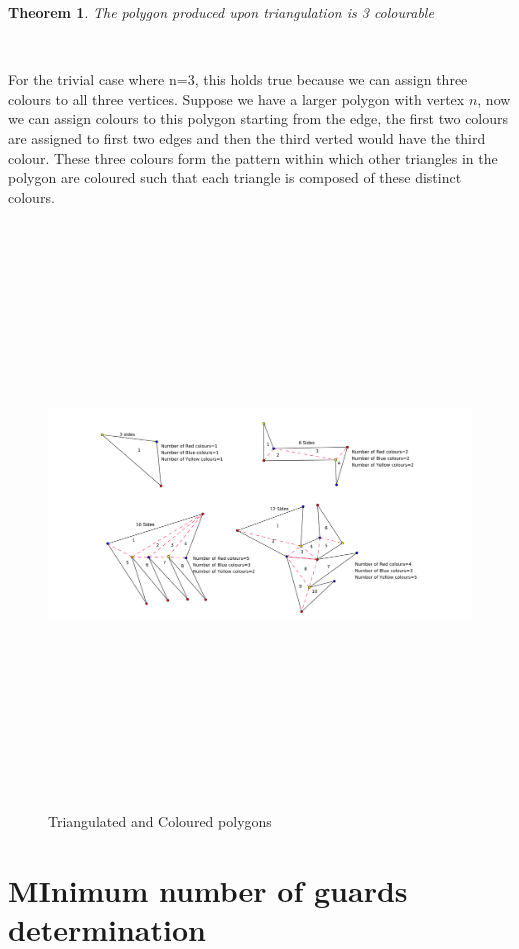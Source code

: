 \documentclass[10pt,a4paper]{article}
\newtheorem{theorem}{Theorem}[section]
\begin{document}
\begin{theorem}
The polygon produced upon triangulation is 3 colourable
\end{theorem}
\\
\begin{Proof}
For the trivial case where n=3, this holds true because we can assign three colours to all three vertices. Suppose we have a larger polygon with vertex $n$, now we can assign colours to this polygon  starting from the edge, the first two colours are assigned to first two edges and then the third verted would have the third colour. These three colours form the pattern within which other triangles in the polygon are coloured such that each triangle is composed of these distinct colours.
\end{Proof}


\begin{figure}[h!]\label{colouration}
\centering
\includegraphics[width=12.0cm,height= 15.5cm]{image1.png}
\caption{Triangulated and Coloured polygons}
\end{figure}
\newpage
\section{MInimum number of guards determination}
\end{document}
